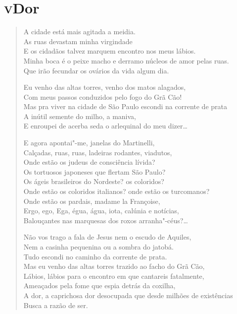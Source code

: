 \chapter[Dor]{\textsc{v}\break Dor }

\begin{verse}
A cidade está mais agitada a meidia.\\
As ruas devastam minha virgindade\\
E os cidadãos talvez marquem encontro nos meus lábios.\\
Minha boca é o peixe macho e derramo núcleos de amor pelas ruas.\\
Que irão fecundar os ovários da vida algum dia.

Eu venho das altas torres, venho dos matos alagados,\\
Com meus passos conduzidos pelo fogo do Grã Cão!\\
Mas pra viver na cidade de São Paulo escondi na corrente de prata\\
A inútil semente do milho, a maniva,\\
E enroupei de acerba seda o arlequinal do meu dizer\ldots{}

E agora apontai"-me, janelas do Martinelli,\\
Calçadas, ruas, ruas, ladeiras rodantes, viadutos,\\
Onde estão os judeus de consciência lívida?\\
Os tortuosos japoneses que flertam São Paulo?\\
Os ágeis brasileiros do Nordeste? os coloridos?\\
Onde estão os coloridos italianos? onde estão os turcomanos?\\
Onde estão os pardais, madame la Françoise,\\
Ergo, ego, Ega, égua, água, iota, calúnia e notícias,\\
Balouçantes nas marquesas dos roxos arranha"-céus?\ldots{}

Não vos trago a fala de Jesus nem o escudo de Aquiles,\\
Nem a casinha pequenina ou a sombra do jatobá.\\
Tudo escondi no caminho da corrente de prata.\\
Mas eu venho das altas torres trazido ao facho do Grã Cão,\\
Lábios, lábios para o encontro em que cantareis fatalmente,\\
Ameaçados pela fome que espia detrás da coxilha,\\
A dor, a caprichosa dor desocupada que desde milhões de existências\\
Busca a razão de ser.
\end{verse}

